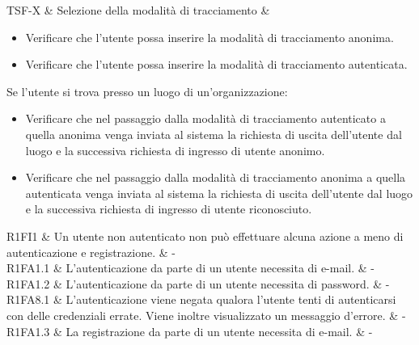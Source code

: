 





TSF-X & Selezione della modalità di tracciamento & \begin{itemize}
    \item Verificare che l'utente possa inserire la modalità di tracciamento anonima.
    \item Verificare che l'utente possa inserire la modalità di tracciamento autenticata.
\end{itemize}
Se l'utente si trova presso un luogo di un'organizzazione:
\begin{itemize}
    \item Verificare che nel passaggio dalla modalità di tracciamento autenticato a quella anonima venga inviata al sistema la richiesta di uscita dell'utente dal luogo e la successiva richiesta di ingresso di utente anonimo.
    \item Verificare che nel passaggio dalla modalità di tracciamento anonima a quella autenticata venga inviata al sistema la richiesta di uscita dell'utente dal luogo e la successiva richiesta di ingresso di utente riconosciuto.
\end{itemize}









R1FI1 & Un utente non autenticato non può effettuare alcuna azione a meno di autenticazione e registrazione. & - \\

R1FA1.1 & L'autenticazione da parte di un utente necessita di e-mail. & - \\

R1FA1.2 & L'autenticazione da parte di un utente necessita di password.  & - \\

R1FA8.1 & L'autenticazione viene negata qualora l'utente tenti di autenticarsi con delle credenziali errate. Viene inoltre visualizzato un messaggio d'errore. & - \\

R1FA1.3 & La registrazione da parte di un utente necessita di e-mail. & - \\

